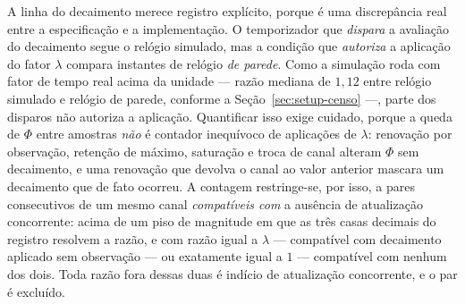 A linha do decaimento merece registro explícito, porque é uma discrepância real entre a
especificação e a implementação. O temporizador que \emph{dispara} a avaliação do
decaimento segue o relógio simulado, mas a condição que \emph{autoriza} a aplicação do
fator $\lambda$ compara instantes de relógio \emph{de parede}. Como a simulação roda
com fator de tempo real acima da unidade --- razão mediana de $1{,}12$ entre relógio
simulado e relógio de parede, conforme a Seção~\ref{sec:setup-censo} ---, parte dos
disparos não autoriza a aplicação. %
Quantificar isso exige cuidado, porque a queda de $\Phi$ entre amostras \emph{não} é
contador inequívoco de aplicações de $\lambda$: renovação por observação, retenção de
máximo, saturação e troca de canal alteram $\Phi$ sem decaimento, e uma renovação que
devolva o canal ao valor anterior mascara um decaimento que de fato ocorreu. A contagem
restringe-se, por isso, a pares consecutivos de um mesmo canal \emph{compatíveis com} a
ausência de atualização concorrente: acima de um piso de magnitude em que as três casas
decimais do registro resolvem a razão, e com razão igual a $\lambda$ --- compatível com
decaimento aplicado sem observação --- ou exatamente igual a $1$ --- compatível com
nenhum dos dois. Toda razão fora dessas duas é indício de atualização concorrente, e o
par é excluído.


